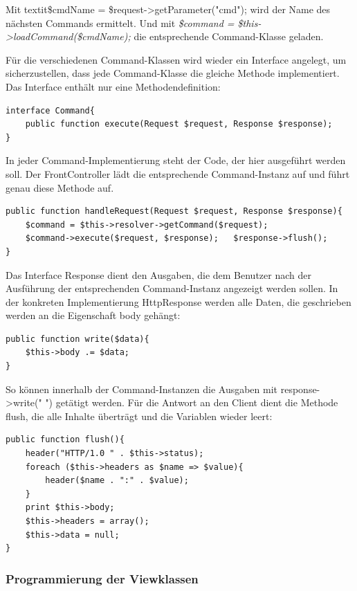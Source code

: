 \documentclass[10.5pt]{scrarticle}
\begin{document}
Mit textit{\$cmdName = \$request->getParameter("cmd");} wird der Name des nächsten Commands ermittelt. 
Und mit \textit{\$command = \$this->loadCommand(\$cmdName);} die entsprechende Command-Klasse geladen.

Für die verschiedenen Command-Klassen wird wieder ein Interface angelegt, um sicherzustellen, dass jede Command-Klasse die gleiche Methode implementiert. Das Interface enthält nur eine Methodendefinition: 

\begin{lstlisting}
interface Command{
    public function execute(Request $request, Response $response);
} 
\end{lstlisting}

In jeder Command-Implementierung steht der Code, der hier ausgeführt werden soll. Der FrontController lädt die entsprechende Command-Instanz auf und führt genau diese Methode auf. 

\begin{lstlisting}
public function handleRequest(Request $request, Response $response){
    $command = $this->resolver->getCommand($request);
    $command->execute($request, $response);   $response->flush();
}
\end{lstlisting}

Das Interface Response dient den Ausgaben, die dem Benutzer nach der Ausführung der entsprechenden Command-Instanz angezeigt werden sollen.  
In der konkreten Implementierung HttpResponse werden alle Daten, die geschrieben werden an die Eigenschaft body gehängt:

\begin{lstlisting}
public function write($data){
    $this->body .= $data;
} 
\end{lstlisting}

So können innerhalb der Command-Instanzen die Ausgaben mit response->write("   ") getätigt werden. 
Für die Antwort an den Client dient die Methode flush, die alle Inhalte überträgt und die Variablen wieder leert:

\begin{lstlisting}
public function flush(){
    header("HTTP/1.0 " . $this->status);
    foreach ($this->headers as $name => $value){
        header($name . ":" . $value);
    }
    print $this->body;
    $this->headers = array();
    $this->data = null;
}
\end{lstlisting}

\subsubsection{Programmierung der Viewklassen}
\end{document}
